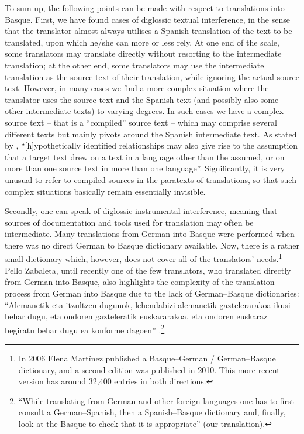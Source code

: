 \documentclass[output=paper]{LSP/langsci}
\begin{document}
To sum up, the following points can be made with respect to translations into Basque. First, we have found cases of diglossic textual interference, in the sense that the translator almost always utilises a Spanish translation of the text to be translated, upon which he/she can more or less rely. At one end of the scale, some translators may translate directly without resorting to the intermediate translation; at the other end, some translators may use the intermediate translation as the source text of their translation, while ignoring the actual source text. However, in many cases we find a more complex situation where the translator uses the source text and the Spanish text (and possibly also some other intermediate texts) to varying degrees. In such cases we have a complex source text – that is a “compiled” source text – which may comprise several different texts but mainly pivots around the Spanish intermediate text. As stated by \citet[72]{Toury1995}, “[h]ypothetically identified relationships may also give rise to the assumption that a target text drew on a text in a language other than the assumed, or on more than one source text in more than one language”. Significantly, it is very unusual to refer to compiled sources in the paratexts of translations, so that such complex situations basically remain essentially invisible.

Secondly, one can speak of diglossic instrumental interference, meaning that sources of documentation and tools used for translation may often be intermediate. Many translations from German into Basque were performed when there was no direct German to Basque dictionary available. Now, there is a rather small dictionary which, however, does not cover all of the translators’ needs.\footnote{In 2006 Elena Martínez published a Basque--German / German--Basque dictionary, and a second edition was published in 2010. This more recent version has around 32,400 entries in both directions.} Pello Zabaleta, until recently one of the few translators, who translated directly from German into Basque, also highlights the complexity of the translation process from German into Basque due to the lack of German--Basque dictionaries: “Alemanetik eta itzultzen dugunok, lehendabizi alemanetik gaztelerarakoa ikusi behar dugu, eta ondoren gazteleratik euskararakoa, eta ondoren euskaraz begiratu behar dugu ea konforme dagoen” \citep{Zabaleta1995}.\footnote{“While translating from German and other foreign languages one has to first consult a German--Spanish, then a Spanish--Basque dictionary and, finally, look at the Basque to check that it is appropriate” (our translation).}
\end{document}
